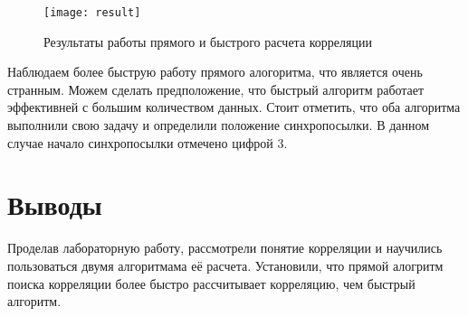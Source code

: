
\parindent=1cm %

\begin{figure}[H]
	\begin{center}
		\texttt{[image: result]}
		\caption{Результаты работы прямого и быстрого расчета корреляции} 
		\label{pic:result} %
	\end{center}
\end{figure}

Наблюдаем более быструю работу прямого алогоритма, что является очень странным. Можем сделать предположение, что быстрый алгоритм работает эффективней с большим количеством данных.
Стоит отметить, что оба алгоритма выполнили свою задачу и определили положение синхропосылки. В данном случае начало синхропосылки отмечено цифрой 3.


\section{Выводы}
Проделав лабораторную работу, рассмотрели понятие корреляции и научились пользоваться двумя алгоритмама её расчета. Установили, что прямой алогритм поиска корреляции более быстро рассчитывает корреляцию, чем быстрый алгоритм.




